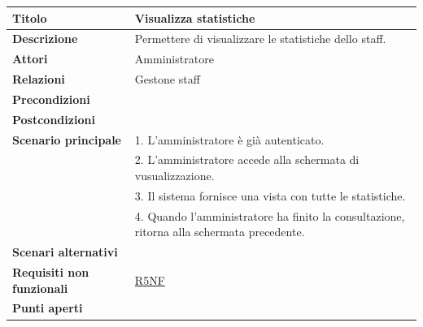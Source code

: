 \documentclass[a4paper]{article}
\begin{document}
\begin{center}
\begin{tabularx}{1\textwidth}{|l|X|}
    \hline
	\textbf{Titolo} & Visualizza statistiche \\
	\hline
	\textbf{Descrizione} & Permettere di visualizzare le statistiche dello staff. \\
	\hline
	\textbf{Attori} & Amministratore \\
	\hline
	\textbf{Relazioni} & Gestone staff \\
	\hline
	\textbf{Precondizioni} &  \\
	\hline
	\textbf{Postcondizioni} &  \\
	\hline
	\textbf{Scenario principale} & 1. L'amministratore è già autenticato.\\
	                             & 2. L'amministratore accede alla schermata di vusualizzazione. \\
								 & 3. Il sistema fornisce una vista con tutte le statistiche. \\
								 & 4. Quando l'amministratore ha finito la consultazione, ritorna alla schermata precedente.\\
	\hline
	\textbf{Scenari alternativi} & \\
	\hline
	\textbf{Requisiti non funzionali} & \hyperlink{R5NF}{R5NF} \\
	\hline
	\textbf{Punti aperti} & \\
	\hline
\end{tabularx}
\end{center}

\end{document}
